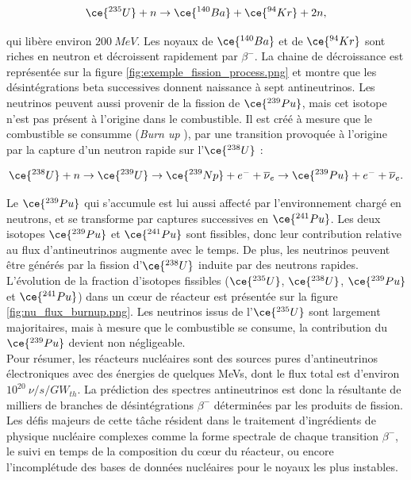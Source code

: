 \begin{equation}
    \ce{^{235}U} + n \rightarrow \ce{^{140}Ba} + \ce{^{94}Kr} + 2n,
\end{equation}

\bigbreak

qui libère environ $\SI{200}{MeV}$. Les noyaux de $\ce{^{140}Ba}$ et de $\ce{^{94}Kr}$ sont riches en neutron et décroissent rapidement par $\beta^-$. La chaine de décroissance est représentée sur la figure \ref{fig:exemple_fission_process.png} et montre que les désintégrations beta successives donnent naissance à sept antineutrinos. Les neutrinos peuvent aussi provenir de la fission de $\ce{^{239}Pu}$, mais cet isotope n'est pas présent à l'origine dans le combustible. Il est créé à mesure que le combustible se consumme (\og \textit{Burn up} \fg{}), par une transition provoquée à l'origine par la capture d'un neutron rapide sur l'$\ce{^{238}U}$ :

\begin{equation}
    \ce{^{238}U} + n \rightarrow \ce{^{239}U} \rightarrow \ce{^{239}Np} + e^- + \overline{\nu}_e \rightarrow \ce{^{239}Pu} + e^- + \overline{\nu}_e.
\end{equation}

\bigbreak

Le $\ce{^{239}Pu}$ qui s'accumule est lui aussi affecté par l'environnement chargé en neutrons, et se transforme par captures successives en $\ce{^{241}Pu}$. Les deux isotopes $\ce{^{239}Pu}$ et $\ce{^{241}Pu}$ sont fissibles, donc leur contribution relative au flux d'antineutrinos augmente avec le temps. De plus, les neutrinos peuvent être générés par la fission d'$\ce{^{238}U}$ induite par des neutrons rapides. L'évolution de la fraction d'isotopes fissibles ($\ce{^{235}U}$, $\ce{^{238}U}$, $\ce{^{239}Pu}$ et $\ce{^{241}Pu}$) dans un c\oe ur de réacteur est présentée sur la figure \ref{fig:nu_flux_burnup.png}. Les neutrinos issus de l'$\ce{^{235}U}$ sont largement majoritaires, mais à mesure que le combustible se consume, la contribution du $\ce{^{239}Pu}$ devient non négligeable.\\

Pour résumer, les réacteurs nucléaires sont des sources pures d'antineutrinos électroniques avec des énergies de quelques MeVs, dont le flux total est d'environ $10^{20} \SI{}{\nu/s/GW_{th}}$. La prédiction des spectres antineutrinos est donc la résultante de milliers de branches de désintégrations $\beta^-$ déterminées par les produits de fission. Les défis majeurs de cette tâche résident dans le traitement d'ingrédients de physique nucléaire complexes comme la forme spectrale de chaque transition $\beta^-$, le suivi en temps de la composition du c\oe ur du réacteur, ou encore l'incomplétude des bases de données nucléaires pour le noyaux les plus instables.\\

